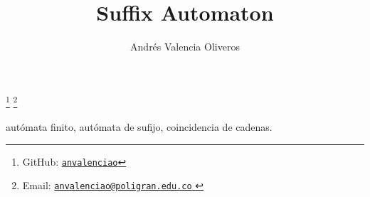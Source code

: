 \begin{frontmatter}
	\title{Suffix Automaton} 
	\author{Andrés Valencia Oliveros}
	\address{Facultad de Ingeniería, Diseño e Innovación\\ 
		Institución Universitaria Politécnico Grancolombiano\\
		Bogotá, Colombia
	}
	\thanks[myGitHub]{GitHub: 
		\href{https://github.com/anvalenciao/SuffixAutomaton}{\texttt{anvalenciao}}
	}
	\thanks[myEmail]{Email: 
		\href{mailto:anvalenciao@poligran.edu.co}{
			\texttt{\normalshape anvalenciao@poligran.edu.co}
		}
	}

	\renewcommand{\abstractname}{\textbf{Resumen}}
	\begin{abstract}
		
	\end{abstract}

	\begin{keyword}
		autómata finito, autómata de sufijo, coincidencia de cadenas.
	\end{keyword}
\end{frontmatter}